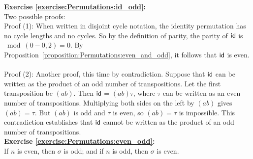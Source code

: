 \noindent\textbf{Exercise  \ref{exercise:Permutations:id_odd}:}\\
Two possible proofs:
\\
Proof (1): When written in disjoint cycle notation, the identity permutation has no cycle lengths and no cycles.  So by the definition of parity, the parity of  $\sf{id}$ is $\bmod(0-0,2) = 0$.  By Proposition~\ref{proposition:Permutations:even_and_odd}, it follows that $\sf{id}$ is even.\\
\\
Proof (2): Another proof, this time by contradiction.  Suppose that $\sf{id}$ can be written as the product of an odd number of transpositions.  Let the first transposition be $(ab)$.  Then $\sf{id}$ = $(ab)\tau$, where $\tau$ can be written as an even number of transpositions.  Multiplying both sides on the left by $(ab)$ gives $(ab) = \tau$.  But $(ab)$ is odd and $\tau$ is even, so $(ab)=\tau$ is impossible. This contradiction establishes that $\sf{id}$ cannot be written as the product of an odd number of transpositions.\\


\noindent\textbf{Exercise  \ref{exercise:Permutations:even_odd}:}\\
If $n$ is even, then $\sigma$ is odd; and if $n$ is odd, then $\sigma$ is even.\\

